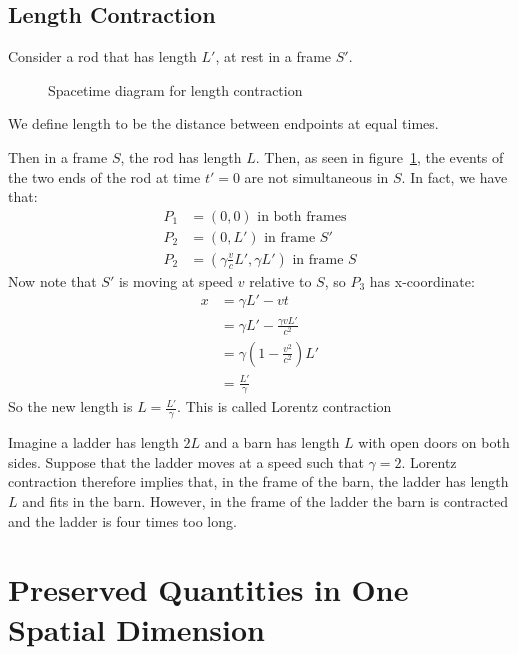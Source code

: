\documentclass[../Main.tex]{subfiles}
\begin{document}
\subsection{Length Contraction}
Consider a rod that has length $L'$, at rest in a frame $S'$.
\begin{figure}[ht]
    \centering
    \caption{Spacetime diagram for length contraction}
    \label{figLengthContraction}
\end{figure}
We define length to be the distance between endpoints at equal times.\par
Then in a frame $S$, the rod has length $L$. Then, as seen in figure~\ref{figLengthContraction}, the events of the two ends of the rod at time $t' = 0$ are not simultaneous in $S$. In fact, we have that:
\begin{align*}
    P_1 &= (0, 0) \text{ in both frames} \\
    P_2 &= (0, L') \text{ in frame } S' \\
    P_2 &= \left(\gamma \frac{v}{c} L', \gamma L'\right) \text{ in frame } S
\end{align*}
Now note that $S'$ is moving at speed $v$ relative to $S$, so $P_3$ has x-coordinate:
\begin{align*}
    x &= \gamma L' - vt \\
    &= \gamma L' - \frac{\gamma v L'}{c^2} \\
    &= \gamma(1 - \frac{v^2}{c^2}) L' \\
    &= \frac{L'}{\gamma}
\end{align*}
So the new length is $L = \frac{L'}{\gamma}$. This is called Lorentz contraction
\begin{example}
    Imagine a ladder has length $2L$ and a barn has length $L$ with open doors on both sides. Suppose that the ladder moves at a speed such that $\gamma = 2$. Lorentz contraction therefore implies that, in the frame of the barn, the ladder has length $L$ and fits in the barn. However, in the frame of the ladder the barn is contracted and the ladder is four times too long.
\end{example}
\section{Preserved Quantities in One Spatial Dimension}
\end{document}

